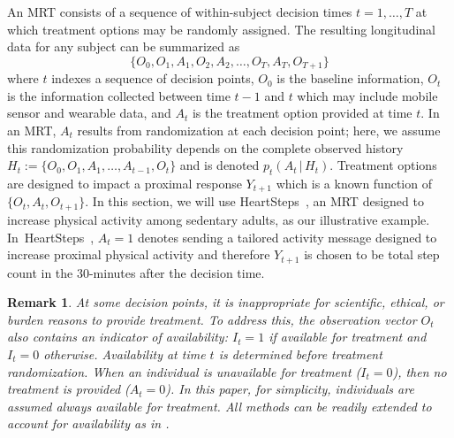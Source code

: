 \documentclass[12pt]{article}
\def\given{\, | \,}
\newtheorem{remark}[thm]{Remark}%
\newcommand{\zw}[1]{\textcolor{blue}{[\textit{ZW: #1}]}}
\begin{document}
An MRT consists of a sequence of within-subject decision times $t=1,\ldots,T$ at which treatment options may be randomly assigned.  The resulting longitudinal data for any subject can be summarized as
$$
\{ O_0, O_1, A_1, O_2, A_2, \ldots, O_T, A_T, O_{T+1} \}
$$
where $t$ indexes a sequence of decision points, $O_0$ is the baseline information, $O_t$ is the information collected between time $t-1$ and $t$ which may include mobile sensor and wearable data, and $A_t$ is the treatment option provided at time $t$.  In an MRT, $A_t$ results from randomization at each decision point; here, we assume this randomization probability depends on the complete observed history $H_t := \{ O_0, O_1, A_1, \ldots, A_{t-1}, O_t \}$ and is denoted $p_t (A_t \given H_t)$. Treatment options are designed to impact a proximal response $Y_{t+1}$ which is a known function of $\{ O_t, A_t, O_{t+1}\}$.
In this section, we will use HeartSteps~\citep{HeartSteps2018}, an MRT designed to increase physical activity among sedentary adults, as our illustrative example.
In~HeartSteps~\citep{HeartSteps2018},  $A_t = 1$ denotes sending a tailored activity message designed to increase proximal physical activity and therefore $Y_{t+1}$ is chosen to be total step count in the 30-minutes after the decision time.

\begin{remark} \normalfont
At some decision points, it is inappropriate for scientific, ethical, or burden reasons to provide treatment. To address this, the observation vector $O_t$ also contains an indicator of availability:
$I_t = 1$ if available for treatment and $I_t = 0$ otherwise. Availability at time $t$ is determined before treatment randomization. When an individual is unavailable for treatment ($I_t = 0$), then no treatment is provided ($A_t = 0$). In this paper, for simplicity, individuals are assumed always available for treatment. All methods can be readily extended to account for availability as in \citet{Boruvkaetal}.


\end{remark}
\end{document}
